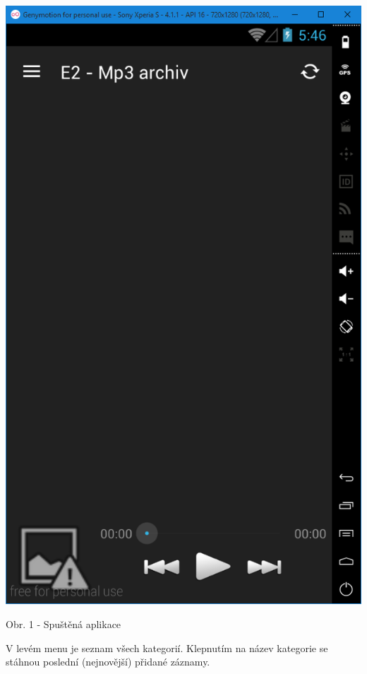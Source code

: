 \documentclass[12pt,a4paper,titlepage]{article}
\begin{document}
{	\begin{center}
		\includegraphics[scale=0.5]{archiv1.png}	
	\end{center}
	\begin{center}
		\footnotesize Obr. 1 - Spuštěná aplikace	
	\end{center}

	V levém menu je seznam všech kategorií. Klepnutím na název kategorie se stáhnou poslední (nejnovější) přidané záznamy. 

}
\end{document}

